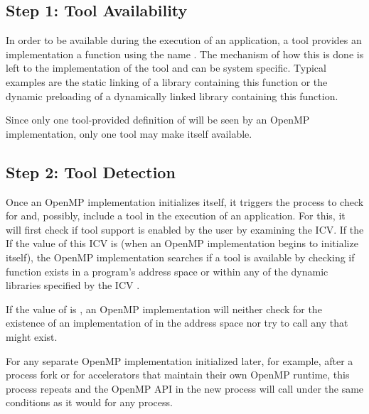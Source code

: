 \subsection{Step 1: Tool Availability}
\label{sec:ToolsSupport_Available}

In order to be available during the execution of an application, a tool provides
an implementation a function using the name . The mechanism
of how this is done is left to the implementation of the tool and can be system
specific. Typical examples are the static linking of a library containing this
function or the dynamic preloading of a dynamically linked library containing
this function.

Since only one tool-provided definition of  will be seen by an OpenMP implementation, only one tool may make itself available.


\subsection{Step 2: Tool Detection}
\label{sec:ToolsSupport_Detection}

Once an OpenMP implementation initializes itself, it triggers the process to check for and, possibly, include a tool in the execution of an application. For this, it will first check if tool support is enabled by the user by examining the  ICV. If the
If the value of this ICV is  (when an OpenMP implementation begins to initialize itself), the OpenMP implementation 
searches if a tool is available by checking if 
function  exists in a program's address space or within any of the dynamic libraries specified by the ICV .



If the value of  is , an OpenMP 
implementation will neither check for the existence of an implementation of
 in the address space nor try to call any that might exist.

For any separate OpenMP implementation initialized later, for example, after a process fork or for accelerators that maintain
their own OpenMP runtime, this process repeats and the OpenMP API in the new process will call 
under the same conditions as it would for any process.


